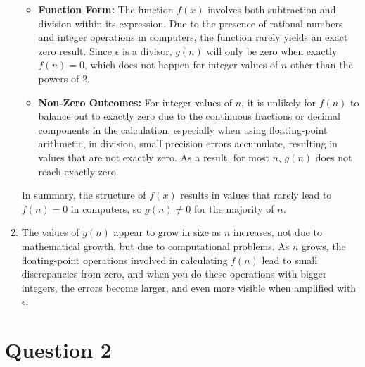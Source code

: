 \documentclass[11pt,a4paper, margin=1in]{article}
\begin{document}
\begin{enumerate}
    \begin{itemize}
        \item \textbf{Function Form:} The function \( f(x) \) involves both subtraction and division within its expression. Due to the presence of rational numbers and integer operations in computers, the function rarely yields an exact zero result. Since \( \epsilon \) is a divisor, \( g(n) \) will only be zero when exactly \( f(n) = 0 \), which does not happen for integer values of \( n \) other than the powers of 2.
        \item \textbf{Non-Zero Outcomes:} For integer values of \( n \), it is unlikely for \( f(n) \) to balance out to exactly zero due to the continuous fractions or decimal components in the calculation, especially when using floating-point arithmetic, in division, small precision errors accumulate, resulting in values that are not exactly zero. As a result, for most \( n \), \( g(n) \) does not reach exactly zero.
    \end{itemize}

    In summary, the structure of \( f(x) \) results in values that rarely lead to \( f(n) = 0 \) in computers, so \( g(n) \neq 0 \) for the majority of \( n \).
    
    \item The values of \( g(n) \) appear to grow in size as \( n \) increases, not due to mathematical growth, but due to computational problems. 
    As \( n \) grows, the floating-point operations involved in calculating \( f(n) \) lead to small discrepancies from zero, and when you do these operations with bigger integers, the errors become larger, and even more visible when amplified with \(\epsilon\).

\end{enumerate}

\section*{Question 2}
\end{document}
